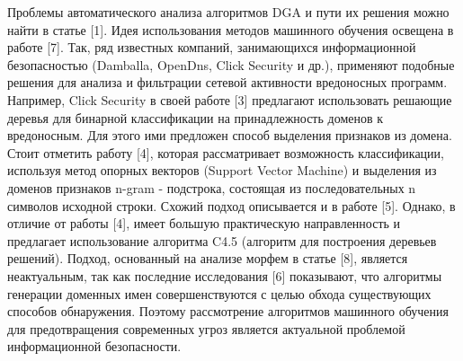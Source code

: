 Проблемы автоматического анализа алгоритмов DGA и пути их решения можно найти в статье [1]. Идея использования методов машинного обучения освещена в работе [7]. Так, ряд известных компаний, занимающихся информационной безопасностью (Damballa, OpenDns, Click Security и др.), применяют подобные решения для анализа и фильтрации сетевой активности вредоносных программ.
Например, Click Security в своей работе [3] предлагают использовать решающие деревья для бинарной классификации на принадлежность доменов к вредоносным. Для этого ими предложен способ выделения признаков из домена.
Стоит отметить работу [4], которая рассматривает возможность классификации, используя метод опорных векторов (Support Vector Machine) и выделения из доменов признаков n-gram - подстрока, состоящая из последовательных n символов исходной строки. Схожий подход описывается и в работе [5]. Однако, в отличие от работы [4], имеет большую практическую направленность и предлагает использование алгоритма C4.5 (алгоритм для построения деревьев решений).
Подход, основанный на анализе морфем в статье [8], является неактуальным, так как последние исследования [6] показывают, что алгоритмы генерации доменных имен совершенствуются с целью обхода существующих способов обнаружения.
Поэтому рассмотрение алгоритмов машинного обучения для предотвращения современных угроз является актуальной проблемой информационной безопасности.

\clearpage